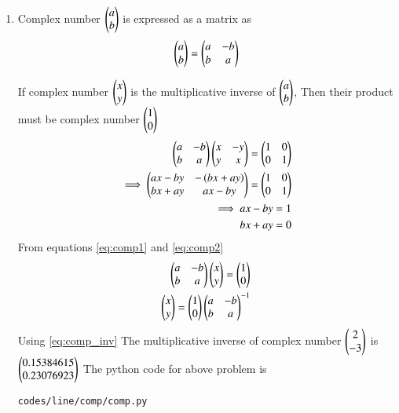 \renewcommand{\theequation}{\theenumi}
\begin{enumerate}[label=\thesection.\arabic*.,ref=\thesection.\theenumi]

\item Complex number $\begin{pmatrix}a\\b\end{pmatrix}$ is expressed as a matrix as 
\begin{align}
\begin{pmatrix}a\\b\end{pmatrix} = \begin{pmatrix}a & -b\\ b & a\end{pmatrix}
\end{align}

If complex number $\begin{pmatrix}x\\y\end{pmatrix}$ is the multiplicative inverse of  $\begin{pmatrix}a \\b\end{pmatrix}$, Then their product must be complex number $\begin{pmatrix}1\\0\end{pmatrix}$
\begin{align}
\begin{pmatrix}a & -b\\b & a\end{pmatrix}\begin{pmatrix}x & -y\\y & x\end{pmatrix} = \begin{pmatrix}1 & 0\\ 0 & 1\end{pmatrix}
\\
\implies \begin{pmatrix}ax-by & -\left(bx+ay\right)\\ bx+ay & ax-by\end{pmatrix} = \begin{pmatrix}1 & 0\\ 0 & 1\end{pmatrix} 
\\
\implies ax-by=1
\label{eq:comp1}
\\
bx+ay=0
\label{eq:comp2}
\end{align}
From equations \ref{eq:comp1} and \ref{eq:comp2}
\begin {align}
 \begin{pmatrix}a&-b\\b&a\end{pmatrix}\begin{pmatrix}x\\y\end{pmatrix}=\begin{pmatrix}1\\0\end{pmatrix}
\\
\begin{pmatrix}x\\y\end{pmatrix}=\begin{pmatrix}1\\0\end{pmatrix}{\ensuremath{\begin{pmatrix}a&-b\\b&a\end{pmatrix}}}^{-1}
\label{eq:comp_inv}
\end{align}
Using \ref{eq:comp_inv} The multiplicative inverse of complex number $\begin{pmatrix}2\\-3\end{pmatrix}$ is $\begin{pmatrix}0.15384615\\0.23076923\end{pmatrix}$
\newline
The python code for above problem is
\begin{lstlisting}
codes/line/comp/comp.py
\end{lstlisting}
\end{enumerate}
